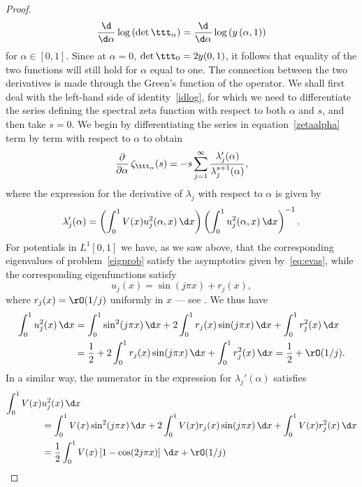 \begin{proof}
\begin{equation}\label{idlog}
\frac{\d}{\d\alpha} \log\left(\det\ttt_{\alpha} \right) =
\frac{\d}{\d\alpha} \log\left(y\left(\alpha,1\right) \right)
\end{equation}
for $\alpha\in [0,1]$. Since at $\alpha=0$, $\det\ttt_0=2 y(0,1)$, it follows that equality of the two functions will still hold
for $\alpha$ equal to one. The connection between the two derivatives is made through the Green's function of the operator.
We shall first deal with the left-hand side of identity~\eqref{idlog}, for which we need to differentiate the series defining the spectral
zeta function with respect to both $\alpha$ and $s$, and then take $s=0$. We begin by differentiating the series in equation~\eqref{zetaalpha}
term by term with respect to $\alpha$ to obtain
\begin{equation}\label{dzetadalpha}
\frac{ \partial}{ \partial \alpha}\,\zeta_{\ttt_{\alpha}}(s) = -s\sum_{j=1}^{\infty} \frac{ \lambda_{j}'(\alpha)}{ \lambda_{j}^{s+1}(\alpha)},
\end{equation}
where the expression for the derivative of $\lambda_{j}$ with respect to $\alpha$ is given by
\[
\lambda_j'(\alpha) = \left(\int_0^1 V(x) u_{j}^2(\alpha,x) \,\d x\right)
\left(\int_0^1 u_{j}^2(\alpha,x) \,\d x\right) ^{-1}.
\]
For potentials in $L^{1}[0,1]$ we have, as we saw above, that the corresponding eigenvalues of problem~\eqref{eigprob}
satisfy the asymptotics given by~\eqref{eq:evas}, while the corresponding eigenfunctions satisfy
\[
u_{j}(x) = \sin(j\pi x) + r_{j}(x),
\]
where $r_{j}(x) = \rO(1/j)$ uniformly in $x$ --- see \cite[Rem.\,2]{SavcShka99}. We thus have
\begin{align*}
\int_{0}^{1} u_{j}^{2}(x) \,\d x & = \int_{0}^{1} \sin^{2}(j \pi x) \,\d x + 2
\int_{0}^{1} r_{j}(x)\sin(j \pi x) \,\d x
+ \int_{0}^{1} r_{j}^{2}(x) \,\d x\\
& = \frac{ 1}{ 2} + 2\int_{0}^{1} r_{j}(x)\sin(j \pi x) \,\d x +
\int_{0}^{1} r_{j}^2(x) \,\d x = \frac{ 1}{ 2} + \rO(1/j).
\end{align*}
In a similar way, the numerator in the expression for $\lambda_{j}'(\alpha)$ satisfies
\begin{align*}
\int_{0}^{1} V(x) &u_{j}^{2}(x) \,\d x \\[-5pt]
& = \int_{0}^{1} V(x)\sin^{2}(j \pi x) \,\d
x + 2 \int_{0}^{1} V(x) r_{j}(x)\sin(j \pi x) \,\d x + \int_{0}^{1} V(x)r_{j}^{2}(x) \,\d x\\
& = \frac{ 1}{ 2}\int_{0}^{1} V(x)\left[1-\cos(2j\pi x)\right] \,\d x + \rO(1/j)\\

\end{align*}
\end{proof}
